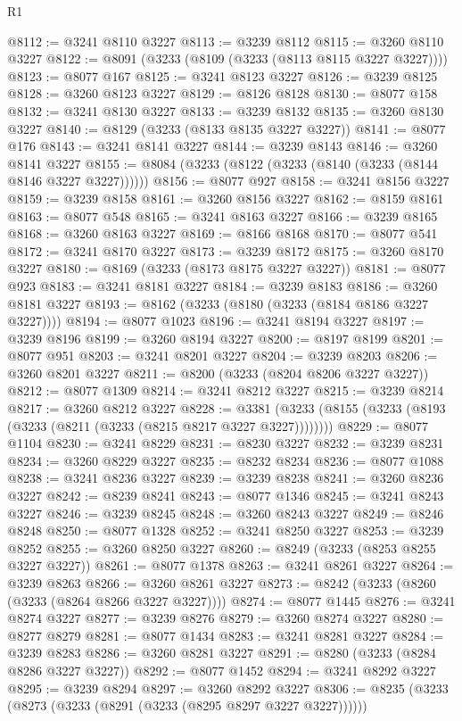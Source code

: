\begin{lexlean}{R1}
\begin{coremodule}
@8112 := @3241 @8110 @3227
@8113 := @3239 @8112
@8115 := @3260 @8110 @3227
@8122 := @8091 (@3233 (@8109 (@3233 (@8113 @8115 @3227 @3227))))
@8123 := @8077 @167
@8125 := @3241 @8123 @3227
@8126 := @3239 @8125
@8128 := @3260 @8123 @3227
@8129 := @8126 @8128
@8130 := @8077 @158
@8132 := @3241 @8130 @3227
@8133 := @3239 @8132
@8135 := @3260 @8130 @3227
@8140 := @8129 (@3233 (@8133 @8135 @3227 @3227))
@8141 := @8077 @176
@8143 := @3241 @8141 @3227
@8144 := @3239 @8143
@8146 := @3260 @8141 @3227
@8155 := @8084 (@3233 (@8122 (@3233 (@8140 (@3233 (@8144 @8146 @3227 @3227))))))
@8156 := @8077 @927
@8158 := @3241 @8156 @3227
@8159 := @3239 @8158
@8161 := @3260 @8156 @3227
@8162 := @8159 @8161
@8163 := @8077 @548
@8165 := @3241 @8163 @3227
@8166 := @3239 @8165
@8168 := @3260 @8163 @3227
@8169 := @8166 @8168
@8170 := @8077 @541
@8172 := @3241 @8170 @3227
@8173 := @3239 @8172
@8175 := @3260 @8170 @3227
@8180 := @8169 (@3233 (@8173 @8175 @3227 @3227))
@8181 := @8077 @923
@8183 := @3241 @8181 @3227
@8184 := @3239 @8183
@8186 := @3260 @8181 @3227
@8193 := @8162 (@3233 (@8180 (@3233 (@8184 @8186 @3227 @3227))))
@8194 := @8077 @1023
@8196 := @3241 @8194 @3227
@8197 := @3239 @8196
@8199 := @3260 @8194 @3227
@8200 := @8197 @8199
@8201 := @8077 @951
@8203 := @3241 @8201 @3227
@8204 := @3239 @8203
@8206 := @3260 @8201 @3227
@8211 := @8200 (@3233 (@8204 @8206 @3227 @3227))
@8212 := @8077 @1309
@8214 := @3241 @8212 @3227
@8215 := @3239 @8214
@8217 := @3260 @8212 @3227
@8228 := @3381 (@3233 (@8155 (@3233 (@8193 (@3233 (@8211 (@3233 (@8215 @8217 @3227 @3227))))))))
@8229 := @8077 @1104
@8230 := @3241 @8229
@8231 := @8230 @3227
@8232 := @3239 @8231
@8234 := @3260 @8229 @3227
@8235 := @8232 @8234
@8236 := @8077 @1088
@8238 := @3241 @8236 @3227
@8239 := @3239 @8238
@8241 := @3260 @8236 @3227
@8242 := @8239 @8241
@8243 := @8077 @1346
@8245 := @3241 @8243 @3227
@8246 := @3239 @8245
@8248 := @3260 @8243 @3227
@8249 := @8246 @8248
@8250 := @8077 @1328
@8252 := @3241 @8250 @3227
@8253 := @3239 @8252
@8255 := @3260 @8250 @3227
@8260 := @8249 (@3233 (@8253 @8255 @3227 @3227))
@8261 := @8077 @1378
@8263 := @3241 @8261 @3227
@8264 := @3239 @8263
@8266 := @3260 @8261 @3227
@8273 := @8242 (@3233 (@8260 (@3233 (@8264 @8266 @3227 @3227))))
@8274 := @8077 @1445
@8276 := @3241 @8274 @3227
@8277 := @3239 @8276
@8279 := @3260 @8274 @3227
@8280 := @8277 @8279
@8281 := @8077 @1434
@8283 := @3241 @8281 @3227
@8284 := @3239 @8283
@8286 := @3260 @8281 @3227
@8291 := @8280 (@3233 (@8284 @8286 @3227 @3227))
@8292 := @8077 @1452
@8294 := @3241 @8292 @3227
@8295 := @3239 @8294
@8297 := @3260 @8292 @3227
@8306 := @8235 (@3233 (@8273 (@3233 (@8291 (@3233 (@8295 @8297 @3227 @3227))))))

\end{coremodule}
\end{lexlean}
